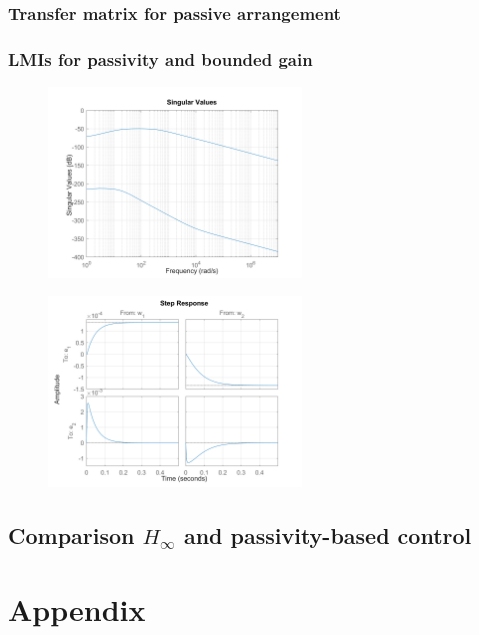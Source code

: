\documentclass{article}
\begin{document}
\subsubsection{Transfer matrix for passive arrangement}

\subsubsection{LMIs for passivity and bounded gain}

\begin{figure}[H]
    \centering
    \includegraphics[width=0.6\textwidth]{figures/K_p_sigma.png}
    \caption{}
\end{figure}

\begin{figure}[H]
    \centering
    \includegraphics[width=0.6\textwidth]{figures/K_p_step.png}
    \caption{}
\end{figure}

\subsection{Comparison $H_\infty$ and passivity-based control}


\section{Appendix}
\end{document}
